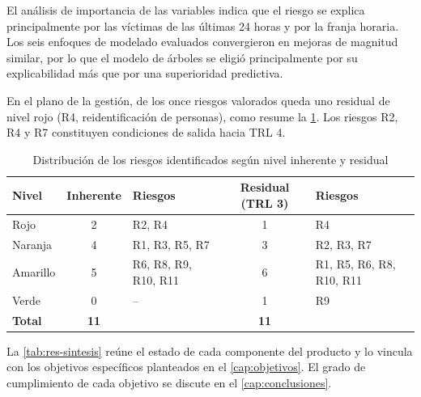 El análisis de importancia de las variables indica que el riesgo se explica principalmente por las víctimas de las últimas 24 horas y por la franja horaria. Los seis enfoques de modelado evaluados convergieron en mejoras de magnitud similar, por lo que el modelo de árboles se eligió principalmente por su explicabilidad más que por una superioridad predictiva.

En el plano de la gestión, de los once riesgos valorados queda uno residual de nivel rojo (R4, reidentificación de personas), como resume la \cref{tab:res-riesgos}. Los riesgos R2, R4 y R7 constituyen condiciones de salida hacia TRL 4.

\begin{table}[htbp]
\centering
\caption{Distribución de los riesgos identificados según nivel inherente y residual}
\label{tab:res-riesgos}
\begin{tabularx}{\linewidth}{@{}lc>{\raggedright\arraybackslash}Xc>{\raggedright\arraybackslash}X@{}}
\toprule
\textbf{Nivel} & \textbf{Inherente} & \textbf{Riesgos} & \textbf{Residual (TRL 3)} & \textbf{Riesgos} \\
\midrule
Rojo & 2 & R2, R4 & 1 & R4 \\
Naranja & 4 & R1, R3, R5, R7 & 3 & R2, R3, R7 \\
Amarillo & 5 & R6, R8, R9, R10, R11 & 6 & R1, R5, R6, R8, R10, R11 \\
Verde & 0 & -- & 1 & R9 \\
\midrule
\textbf{Total} & \textbf{11} & & \textbf{11} & \\
\bottomrule
\end{tabularx}
\end{table}

La \cref{tab:res-sintesis} reúne el estado de cada componente del producto y lo vincula con los objetivos específicos planteados en el \cref{cap:objetivos}. El grado de cumplimiento de cada objetivo se discute en el \cref{cap:conclusiones}.

